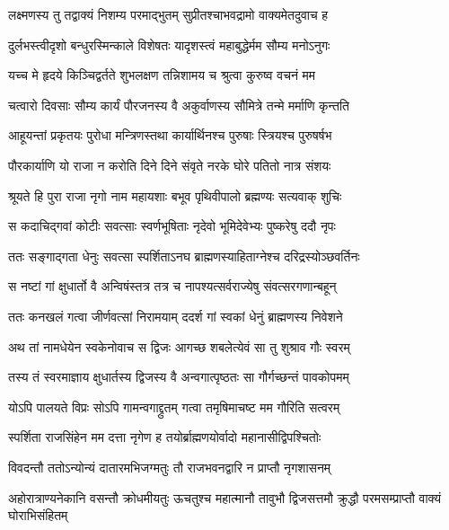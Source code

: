 
\twolineshloka
{लक्ष्मणस्य तु तद्वाक्यं निशम्य परमाद्भुतम्}
{सुप्रीतश्चाभवद्रामो वाक्यमेतदुवाच ह} %

\twolineshloka
{दुर्लभस्त्वीदृशो बन्धुरस्मिन्काले विशेषतः}
{यादृशस्त्वं महाबुद्धेर्मम सौम्य मनोऽनुगः} %

\twolineshloka
{यच्च मे हृदये किञ्चिद्वर्तते शुभलक्षण}
{तन्निशामय च श्रुत्वा कुरुष्व वचनं मम} %

\twolineshloka
{चत्वारो दिवसाः सौम्य कार्यं पौरजनस्य वै}
{अकुर्वाणस्य सौमित्रे तन्मे मर्माणि कृन्तति} %

\twolineshloka
{आहूयन्तां प्रकृतयः पुरोधा मन्त्रिणस्तथा}
{कार्यार्थिनश्च पुरुषाः स्त्रियश्च पुरुषर्षभ} %

\twolineshloka
{पौरकार्याणि यो राजा न करोति दिने दिने}
{संवृते नरके घोरे पतितो नात्र संशयः} %

\twolineshloka
{श्रूयते हि पुरा राजा नृगो नाम महायशाः}
{बभूव पृथिवीपालो ब्रह्मण्यः सत्यवाक् शुचिः} %

\twolineshloka
{स कदाचिद्गवां कोटीः सवत्साः स्वर्णभूषिताः}
{नृदेवो भूमिदेवेभ्यः पुष्करेषु ददौ नृपः} %

\twolineshloka
{ततः सङ्गाद्गता धेनुः सवत्सा स्पर्शिताऽनघ}
{ब्राह्मणस्याहिताग्नेश्च दरिद्रस्योञ्छवर्तिनः} %

\twolineshloka
{स नष्टां गां क्षुधार्तो वै अन्विषंस्तत्र तत्र च}
{नापश्यत्सर्वराज्येषु संवत्सरगणान्बहून्} %

\twolineshloka
{ततः कनखलं गत्वा जीर्णवत्सां निरामयाम्}
{ददर्श गां स्वकां धेनुं ब्राह्मणस्य निवेशने} %

\twolineshloka
{अथ तां नामधेयेन स्वकेनोवाच स द्विजः}
{आगच्छ शबलेत्येवं सा तु शुश्राव गौः स्वरम्} %

\twolineshloka
{तस्य तं स्वरमाज्ञाय क्षुधार्तस्य द्विजस्य वै}
{अन्वगात्पृष्ठतः सा गौर्गच्छन्तं पावकोपमम्} %

\twolineshloka
{योऽपि पालयते विप्रः सोऽपि गामन्वगाद्द्रुतम्}
{गत्वा तमृषिमाचष्ट मम गौरिति सत्वरम्} %

\twolineshloka
{स्पर्शिता राजसिंहेन मम दत्ता नृगेण ह}
{तयोर्ब्राह्मणयोर्वादो महानासीद्विपश्चितोः} %

\twolineshloka
{विवदन्तौ ततोऽन्योन्यं दातारमभिजग्मतुः}
{तौ राजभवनद्वारि न प्राप्तौ नृगशासनम्} %

\twolineshloka
{अहोरात्राण्यनेकानि वसन्तौ क्रोधमीयतुः}
{ऊचतुश्च महात्मानौ तावुभौ द्विजसत्तमौ क्रुद्धौ परमसम्प्राप्तौ वाक्यं घोराभिसंहितम्} %

